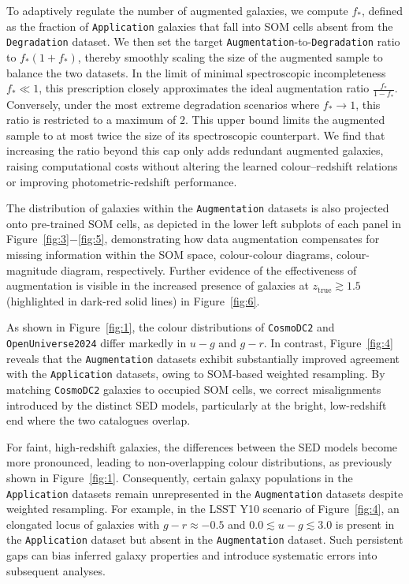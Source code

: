 To adaptively regulate the number of augmented galaxies, we compute \(f_\ast\), defined as the fraction of \texttt{Application} galaxies that fall into SOM cells absent from the \texttt{Degradation} dataset. We then set the target \texttt{Augmentation}-to-\texttt{Degradation} ratio to \(f_\ast \left(1  + f_\ast\right)\), thereby smoothly scaling the size of the augmented sample to balance the two datasets. In the limit of minimal spectroscopic incompleteness \(f_\ast \ll 1\), this prescription closely approximates the ideal augmentation ratio \(\frac{f_\ast}{1 - f_\ast}\). Conversely, under the most extreme degradation scenarios where \(f_\ast \to 1\), this ratio is restricted to a maximum of \(2\). This upper bound limits the augmented sample to at most twice the size of its spectroscopic counterpart. We find that increasing the ratio beyond this cap only adds redundant augmented galaxies, raising computational costs without altering the learned colour–redshift relations or improving photometric-redshift performance.

The distribution of galaxies within the \texttt{Augmentation} datasets is also projected onto pre-trained SOM cells, as depicted in the lower left subplots of each panel in Figure~\ref{fig:3}\({-}\)\ref{fig:5}, demonstrating how data augmentation compensates for missing information within the SOM space, colour-colour diagrams, colour-magnitude diagram, respectively. Further evidence of the effectiveness of augmentation is visible in the increased presence of galaxies at \(z_\mathrm{true} \gtrsim 1.5\) (highlighted in dark-red solid lines) in Figure~\ref{fig:6}. 

As shown in Figure~\ref{fig:1}, the colour distributions of \texttt{CosmoDC2} and \texttt{OpenUniverse2024} differ markedly in \(u - g\) and \(g - r\). In contrast, Figure~\ref{fig:4} reveals that the \texttt{Augmentation} datasets exhibit substantially improved agreement with the \texttt{Application} datasets, owing to SOM‐based weighted resampling. By matching \texttt{CosmoDC2} galaxies to occupied SOM cells, we correct misalignments introduced by the distinct SED models, particularly at the bright, low-redshift end where the two catalogues overlap.

For faint, high-redshift galaxies, the differences between the SED models become more pronounced, leading to non-overlapping colour distributions, as previously shown in Figure~\ref{fig:1}. Consequently, certain galaxy populations in the \texttt{Application} datasets remain unrepresented in the \texttt{Augmentation} datasets despite weighted resampling. For example, in the LSST Y10 scenario of Figure~\ref{fig:4}, an elongated locus of galaxies with \(g - r \approx -0.5\) and \(0.0 \lesssim u - g \lesssim 3.0\) is present in the \texttt{Application} dataset but absent in the \texttt{Augmentation} dataset. Such persistent gaps can bias inferred galaxy properties and introduce systematic errors into subsequent analyses.  

